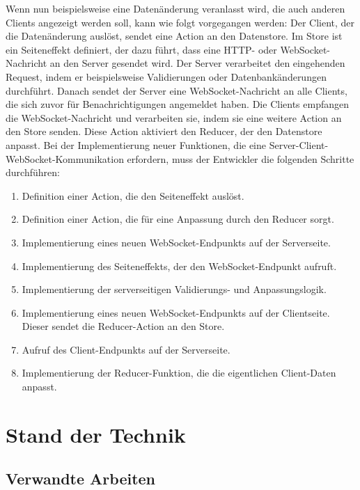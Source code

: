 \documentclass[12pt]{book}          %
\begin{document}
Wenn nun beispielsweise eine Datenänderung veranlasst wird, die auch anderen Clients angezeigt werden soll, kann wie folgt vorgegangen werden: Der Client, der die Datenänderung auslöst, sendet eine Action an den Datenstore. Im Store ist ein Seiteneffekt definiert, der dazu führt, dass eine HTTP- oder WebSocket-Nachricht an den Server gesendet wird. Der Server verarbeitet den eingehenden Request, indem er beispielsweise Validierungen oder Datenbankänderungen durchführt. Danach sendet der Server eine WebSocket-Nachricht an alle Clients, die sich zuvor für Benachrichtigungen angemeldet haben. Die Clients empfangen die WebSocket-Nachricht und verarbeiten sie, indem sie eine weitere Action an den Store senden. Diese Action aktiviert den Reducer, der den Datenstore anpasst. Bei der Implementierung neuer Funktionen, die eine Server-Client-WebSocket-Kommunikation erfordern, muss der Entwickler die folgenden Schritte durchführen:
\begin{enumerate}
    \item Definition einer Action, die den Seiteneffekt auslöst.
    \item Definition einer Action, die für eine Anpassung durch den Reducer sorgt.
    \item Implementierung eines neuen WebSocket-Endpunkts auf der Serverseite.
    \item Implementierung des Seiteneffekts, der den WebSocket-Endpunkt aufruft.
    \item Implementierung der serverseitigen Validierungs- und Anpassungslogik.
    \item Implementierung eines neuen WebSocket-Endpunkts auf der Clientseite. Dieser sendet die Reducer-Action an den Store.
    \item Aufruf des Client-Endpunkts auf der Serverseite.
    \item Implementierung der Reducer-Funktion, die die eigentlichen Client-Daten anpasst.
\end{enumerate}

\chapter{Stand der Technik}
\label{chap-stand-der-technik}

\section{Verwandte Arbeiten}
\label{sec-verwandte-arbeiten}
\end{document}
